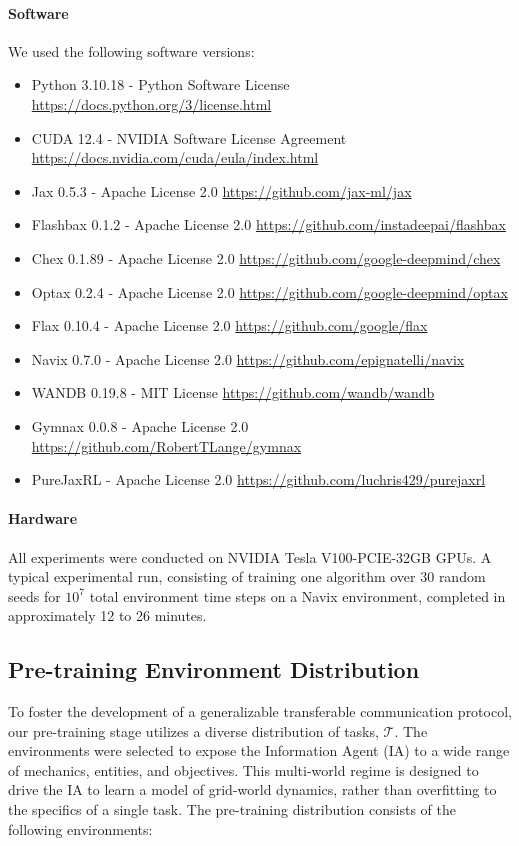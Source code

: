 \documentclass[letterpaper]{article} %
\begin{document}
\begin{appendix}
\paragraph{Software} We used the following software versions:
\begin{itemize}
    \item Python 3.10.18 - Python Software License \url{https://docs.python.org/3/license.html}
    \item CUDA 12.4 - NVIDIA Software License Agreement \url{https://docs.nvidia.com/cuda/eula/index.html}
    \item Jax 0.5.3 - Apache License 2.0 \url{https://github.com/jax-ml/jax}
    \item Flashbax 0.1.2 - Apache License 2.0 \url{https://github.com/instadeepai/flashbax}
    \item Chex 0.1.89 - Apache License 2.0 \url{https://github.com/google-deepmind/chex}
    \item Optax 0.2.4 - Apache License 2.0 \url{https://github.com/google-deepmind/optax}
    \item Flax 0.10.4 - Apache License 2.0 \url{https://github.com/google/flax}
    \item Navix 0.7.0 - Apache License 2.0 \url{https://github.com/epignatelli/navix}
    \item WANDB 0.19.8 - MIT License \url{https://github.com/wandb/wandb}
    \item Gymnax 0.0.8 - Apache License 2.0 \url{https://github.com/RobertTLange/gymnax}
    \item PureJaxRL - Apache License 2.0 \url{https://github.com/luchris429/purejaxrl}
\end{itemize}

\paragraph{Hardware} All experiments were conducted on NVIDIA Tesla V100-PCIE-32GB GPUs. A typical experimental run, consisting of training one algorithm over 30 random seeds for $10^7$ total environment time steps on a Navix environment, completed in approximately 12 to 26 minutes.

\subsection{Pre-training Environment Distribution}

To foster the development of a generalizable transferable communication protocol, our pre-training stage utilizes a diverse distribution of tasks, $\mathcal{T}$. The environments were selected to expose the Information Agent (IA) to a wide range of mechanics, entities, and objectives. This multi-world regime is designed to drive the IA to learn a model of grid-world dynamics, rather than overfitting to the specifics of a single task. The pre-training distribution consists of the following environments:


\end{appendix}
\end{document}
